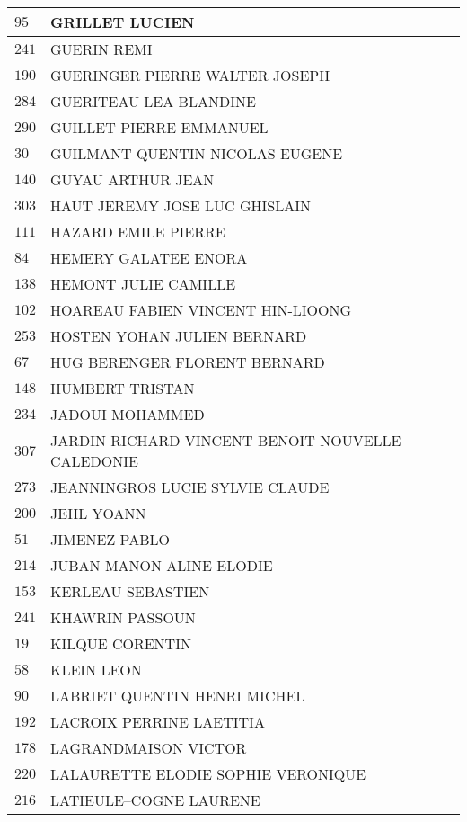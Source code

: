 \begin{xltabular}{\linewidth}{|l|X|}
    \hline
    $95$ & GRILLET LUCIEN \\
    \hline
    $241$ & GUERIN REMI \\
    \hline
    $190$ & GUERINGER PIERRE WALTER JOSEPH \\
    \hline
    $284$ & GUERITEAU LEA BLANDINE \\
    \hline
    $290$ & GUILLET PIERRE-EMMANUEL \\
    \hline
    $30$ & GUILMANT QUENTIN NICOLAS EUGENE \\
    \hline
    $140$ & GUYAU ARTHUR JEAN \\
    \hline
    $303$ & HAUT JEREMY JOSE LUC GHISLAIN \\
    \hline
    $111$ & HAZARD EMILE PIERRE \\
    \hline
    $84$ & HEMERY GALATEE ENORA \\
    \hline
    $138$ & HEMONT JULIE CAMILLE \\
    \hline
    $102$ & HOAREAU FABIEN VINCENT HIN-LIOONG \\
    \hline
    $253$ & HOSTEN YOHAN JULIEN BERNARD \\
    \hline
    $67$ & HUG BERENGER FLORENT BERNARD \\
    \hline
    $148$ & HUMBERT TRISTAN \\
    \hline
    $234$ & JADOUI MOHAMMED \\
    \hline
    $307$ & JARDIN RICHARD VINCENT BENOIT NOUVELLE CALEDONIE \\
    \hline
    $273$ & JEANNINGROS LUCIE SYLVIE CLAUDE \\
    \hline
    $200$ & JEHL YOANN \\
    \hline
    $51$ & JIMENEZ PABLO \\
    \hline
    $214$ & JUBAN MANON ALINE ELODIE \\
    \hline
    $153$ & KERLEAU SEBASTIEN \\
    \hline
    $241$ & KHAWRIN PASSOUN \\
    \hline
    $19$ & KILQUE CORENTIN \\
    \hline
    $58$ & KLEIN LEON \\
    \hline
    $90$ & LABRIET QUENTIN HENRI MICHEL \\
    \hline
    $192$ & LACROIX PERRINE LAETITIA \\
    \hline
    $178$ & LAGRANDMAISON VICTOR \\
    \hline
    $220$ & LALAURETTE ELODIE SOPHIE VERONIQUE \\
    \hline
    $216$ & LATIEULE--COGNE LAURENE \\

\end{xltabular}
